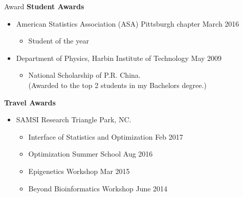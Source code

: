 \documentclass{resume} %
\begin{document}
\begin{rSection}{Award}
\textbf{Student Awards}
\begin{itemize}[noitemsep,topsep=0pt]
\item American Statistics Association (ASA) Pittsburgh chapter  \hfill March 2016
\begin{itemize}[noitemsep,topsep=0pt]
\item Student of the year
\end{itemize}
\item Department of Physics, Harbin Institute of Technology \hfill May 2009
\begin{itemize}[noitemsep,topsep=0pt]
\item National Scholarship of P.R. China. \\(Awarded to the top 2 students in my Bachelors degree.)
\end{itemize}
\end{itemize}


\textbf{Travel Awards} 
\begin{itemize}[noitemsep,topsep=0pt]
\item SAMSI Research Triangle Park, NC.	
\begin{itemize}[noitemsep,topsep=0pt]
\item {Interface of Statistics and Optimization} \hfill Feb 2017
\item {Optimization Summer School} \hfill Aug 2016
\item {Epigenetics Workshop} \hfill Mar 2015
\item {Beyond Bioinformatics Workshop} \hfill June 2014
\end{itemize}

\end{itemize}

\end{rSection}

\end{document}
